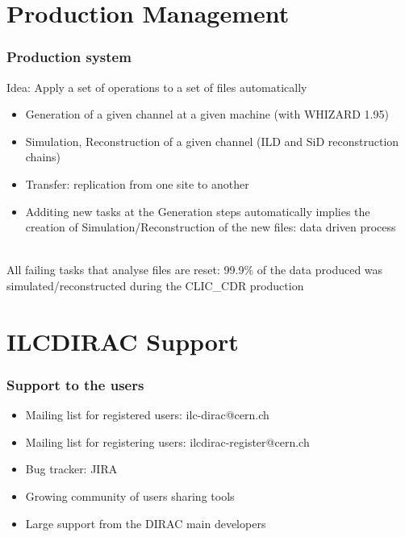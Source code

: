 \documentclass[10pt,table,dvipsnames]{beamer}
\begin{document}
\section{Production Management}
\label{sec:ts}

\begin{frame}
  \frametitle{Production system}
Idea: \alert{Apply a set of operations to a set of files automatically}
\begin{itemize}
\item {\color{NavyBlue}Generation} of a given channel at a given machine (with WHIZARD 1.95)
\item {\color{NavyBlue}Simulation, Reconstruction} of a given channel (ILD and SiD
  reconstruction chains)
\item {\color{NavyBlue}Transfer}: replication from one site to another
\item Additing new tasks at the Generation steps automatically implies
  the creation of Simulation/Reconstruction of the new files: \alert{data
  driven process}
\end{itemize}
~\\
All failing tasks that analyse files are reset: \alert{99.9\% of the data
produced was simulated/reconstructed} during the CLIC\_CDR production
\end{frame}

\section{ILCDIRAC Support}
\label{sec:support}

\begin{frame}
  \frametitle{Support to the users}
\begin{itemize}
 \item Mailing list for registered users: ilc-dirac@cern.ch
 \item Mailing list for registering users: ilcdirac-register@cern.ch
 \item Bug tracker: JIRA
 \item Growing community of users sharing tools
 \item Large support from the DIRAC main developers
\end{itemize}
\end{frame}
\end{document}
